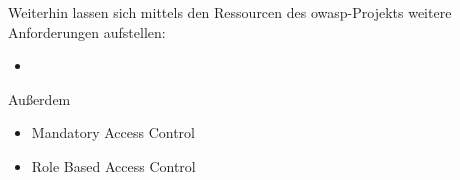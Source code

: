 	Weiterhin lassen sich mittels den Ressourcen des \gls{owasp}-Projekts\cite{Miessler2015}\cite{Miessler2015a} weitere Anforderungen aufstellen:
	\begin{itemize}
	    \item 
	\end{itemize}
	
	Außerdem
	\begin{itemize}
	    \item Mandatory Access Control
	    \item Role Based Access Control
	\end{itemize}
